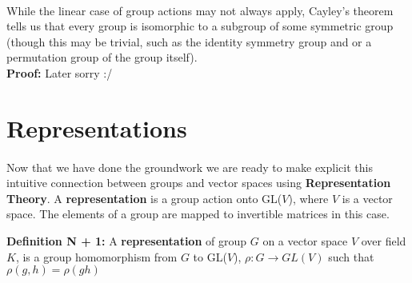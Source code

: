 \documentclass[twoside]{article}
\begin{document}
\paragraph*{} While the linear case of group actions may not always apply, 
Cayley's theorem tells us that every group is isomorphic to a subgroup of some 
symmetric group (though this may be trivial, such as the identity symmetry group 
and or a permutation group of the group itself). \\
\textbf{Proof:} Later sorry :/

\section{Representations}
\paragraph*{} Now that we have done the groundwork we are ready to make 
explicit this intuitive connection between groups and vector spaces using 
\textbf{Representation Theory}. A \textbf{representation} is a group action onto GL($V$), 
where $V$ is a vector space. The elements of a group are mapped to invertible 
matrices in this case. 

\textbf{Definition N + 1:} A \textbf{representation} of group $G$ on a vector space 
$V$ over field $K$, is a group homomorphism from $G$ to GL($V$), $\rho: G \rightarrow GL(V)$ 
such that $\rho(g, h) = \rho(gh)$ 
\end{document}
